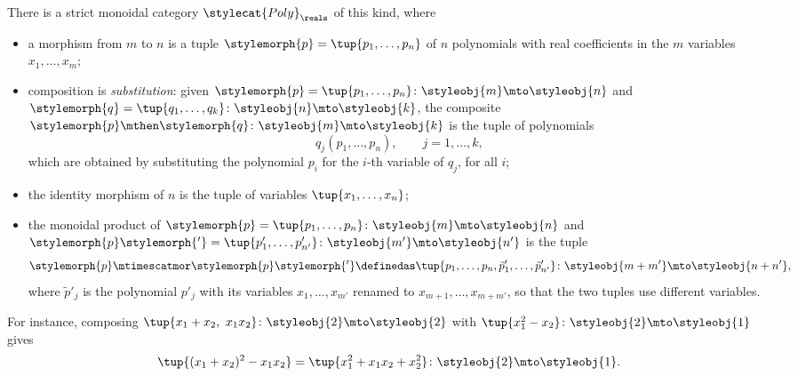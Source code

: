 \begin{example}
    \label{exa:polynomial-maps}
    There is a strict monoidal category $\stylecat{Poly}_\reals$ of this kind, where
    \begin{itemize}
        \item a morphism from $m$ to $n$ is a tuple $\stylemorph{p} = \tup{p_1, \dots, p_n}$ of $n$ polynomials with real coefficients in the $m$ variables $x_1, \dots, x_m$;
        \item composition is \emph{substitution}: given $\stylemorph{p} = \tup{p_1, \dots, p_n} \colon \styleobj{m} \mto \styleobj{n}$ and $\stylemorph{q} = \tup{q_1, \dots, q_k} \colon \styleobj{n} \mto \styleobj{k}$, the composite $\stylemorph{p} \mthen \stylemorph{q} \colon \styleobj{m} \mto \styleobj{k}$ is the tuple of polynomials
              \begin{equation}
                  \label{eq:polynomial-maps-composition}
                  q_j(p_1, \dots, p_n), \qquad j = 1, \dots, k,
              \end{equation}
              which are obtained by substituting the polynomial $p_i$ for the $i$-th variable of $q_j$, for all $i$;
        \item the identity morphism of $n$ is the tuple of variables $\tup{x_1, \dots, x_n}$;
        \item the monoidal product of $\stylemorph{p} = \tup{p_1, \dots, p_n} \colon \styleobj{m} \mto \styleobj{n}$ and $\stylemorph{p}\stylemorph{'} = \tup{p'_1, \dots, p'_{n'}} \colon \styleobj{m'} \mto \styleobj{n'}$ is the tuple
              \begin{equation}
                  \stylemorph{p} \mtimescatmor \stylemorph{p}\stylemorph{'} \definedas \tup{p_1, \dots, p_n, \tilde{p}'_1, \dots, \tilde{p}'_{n'}} \colon \styleobj{m + m'} \mto \styleobj{n + n'},
              \end{equation}
              where $\tilde{p}'_j$ is the polynomial $p'_j$ with its variables $x_1, \dots, x_{m'}$ renamed to $x_{m+1}, \dots, x_{m+m'}$, so that the two tuples use different variables.
    \end{itemize}
    For instance, composing $\tup{x_1 + x_2,\ x_1 x_2} \colon \styleobj{2} \mto \styleobj{2}$ with $\tup{x_1^2 - x_2} \colon \styleobj{2} \mto \styleobj{1}$ gives
    \begin{equation}
        \tup{(x_1 + x_2)^2 - x_1 x_2} = \tup{x_1^2 + x_1 x_2 + x_2^2} \colon \styleobj{2} \mto \styleobj{1}.
    \end{equation}


\end{example}
